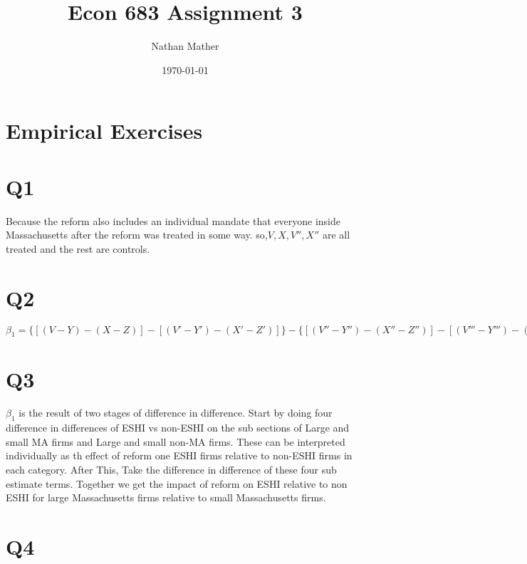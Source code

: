 \documentclass[11pt]{article}
\title{Econ 683 Assignment 3} %
\author{Nathan Mather} %
\date{\today} %
\begin{document}
	
\maketitle %

\setcounter{tocdepth}{2} %



\section{Empirical Exercises}


 


\section{Q1}

Because the reform also includes an individual mandate that everyone inside Massachusetts after the reform was treated in some way. so,$ V, X, V'',X''$ are all treated and the rest are controls. 


\section{Q2}

$\beta_1 = \{[(V-Y) - (X-Z)] - [(V'-Y') - (X'-Z')]\} - \{[(V'' - Y'') - (X''-Z'')] - [(V'''-Y''')-(X'''-Z''')]\}$

\section{Q3}

$\beta_1$ is the result of two stages of difference in difference. Start by doing four difference in differences of ESHI vs non-ESHI on the sub sections of Large and small MA firms and Large and small non-MA firms. These can be interpreted individually as th effect of reform one ESHI firms relative to non-ESHI firms in each category. After This, Take the difference in difference of these four sub estimate terms. Together we get the impact of reform on ESHI relative to non ESHI for large Massachusetts firms relative to small Massachusetts firms. 

\section{Q4}
\end{document}
